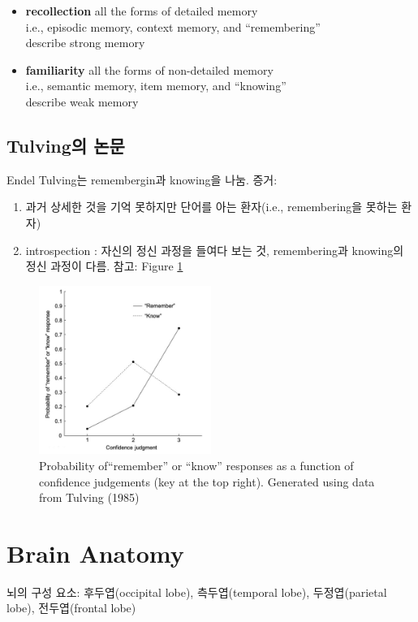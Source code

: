 \documentclass[../note.tex]{subfiles}
\begin{document}
\begin{itemize}
  \item{\textbf{recollection}}
    all the forms of detailed memory\\
    i.e., episodic memory, context memory, and ``remembering''\\
    describe strong memory
  \item{\textbf{familiarity}}
    all the forms of non-detailed memory\\
    i.e., semantic memory, item memory, and ``knowing''\\
    describe weak memory
\end{itemize}

\subsection{Tulving의 논문}
Endel Tulving는 remembergin과 knowing을 나눔. 증거:
\begin{enumerate}
  \item 과거 상세한 것을 기억 못하지만 단어를 아는 환자(i.e., remembering을 못하는 환자)
  \item introspection : 자신의 정신 과정을 들여다 보는 것, remembering과 knowing의 정신 과정이 다름.
    참고: Figure \ref{fig:tulving_experiment}
\end{enumerate}

\begin{figure}[h]
  \centering
  \includegraphics[width=0.5\textwidth]{image/tulving_experiment}
  \caption{Probability of“remember” or
“know” responses as a function of confidence
judgements (key at the top right). Generated using data from Tulving (1985)}
  \label{fig:tulving_experiment}
\end{figure}


\section{Brain Anatomy}
뇌의 구성 요소: 후두엽(occipital lobe), 측두엽(temporal lobe), 두정엽(parietal lobe), 전두엽(frontal lobe)
\end{document}
